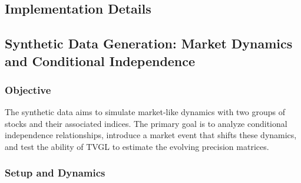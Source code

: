 \documentclass{article}
\begin{document}
\subsection{Implementation Details}
\label{subsec:Implementation Details}

\subsection{Synthetic Data Generation: Market Dynamics and Conditional Independence}
\label{subsec:synthetic_data}

\subsubsection{Objective}
The synthetic data aims to simulate market-like dynamics with two groups of stocks and their associated indices. The primary goal is to analyze conditional independence relationships, introduce a market event that shifts these dynamics, and test the ability of TVGL to estimate the evolving precision matrices.

\subsubsection{Setup and Dynamics}
\end{document}
